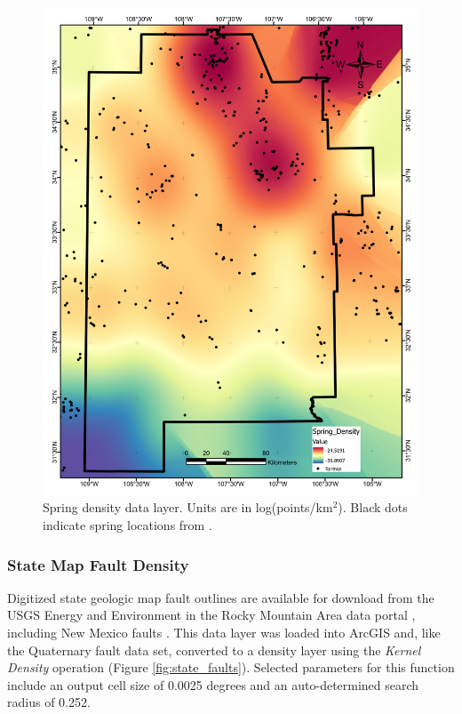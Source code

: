\begin{figure}[!htp]
\centering
\includegraphics[scale=.50]{templates/images/Figure-SpringDensity.pdf}
\caption[Spring density data layer]{Spring density data layer. Units are in log(points/km$^2$). Black dots indicate spring locations from \protect\citep{usgs_national_2021}.}
\label{fig:feat_spring}
\end{figure}

\subsubsection{State Map Fault Density}

Digitized state geologic map fault outlines are available for download from the USGS Energy and Environment in the Rocky Mountain Area data portal \citep{usgs_eerma_2021}, including New Mexico faults \citep{stoeser_usgs_2005}. This data layer was loaded into ArcGIS and, like the Quaternary fault data set, converted to a density layer using the \textit{Kernel Density} operation (Figure \ref{fig:state_faults}). Selected parameters for this function include an output cell size of 0.0025 degrees and an auto-determined search radius of 0.252.

